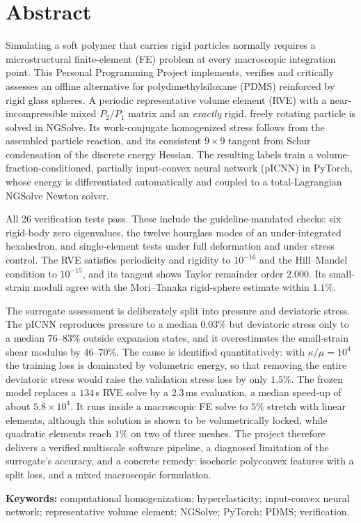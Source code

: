 \chapter*{Abstract}

Simulating a soft polymer that carries rigid particles normally requires a
microstructural finite-element (FE) problem at every macroscopic integration
point. This Personal Programming Project implements, verifies and critically
assesses an offline alternative for polydimethylsiloxane (PDMS) reinforced by
rigid glass spheres. A periodic representative volume element (RVE) with a
near-incompressible mixed $P_2/P_1$ matrix and an \emph{exactly} rigid,
freely rotating particle is solved in NGSolve. Its work-conjugate homogenized
stress follows from the assembled particle reaction, and its consistent
$9\times9$ tangent from Schur condensation of the discrete energy Hessian. The
resulting labels train a volume-fraction-conditioned, partially input-convex
neural network (pICNN) in PyTorch, whose energy is differentiated
automatically and coupled to a total-Lagrangian NGSolve Newton solver.

All 26 verification tests pass. These include the guideline-mandated checks:
six rigid-body zero eigenvalues, the twelve hourglass modes of an under-integrated hexahedron, and
single-element tests under full deformation and under stress control. The RVE satisfies periodicity and rigidity to $10^{-16}$ and the
Hill--Mandel condition to $10^{-15}$, and its tangent shows Taylor remainder
order $2.000$. Its small-strain moduli agree with the Mori--Tanaka rigid-sphere
estimate within $1.1\%$.

The surrogate assessment is deliberately split into pressure and deviatoric
stress. The pICNN reproduces pressure to a median $0.03\%$ but deviatoric stress
only to a median $76$--$83\%$ outside expansion states, and it overestimates the small-strain shear
modulus by $46$--$70\%$. The cause is identified quantitatively: with
$\kappa/\mu=10^4$ the training loss is dominated by volumetric energy, so that
removing the entire deviatoric stress would raise the validation stress loss
by only $1.5\%$. The
frozen model replaces a $134\,$s RVE solve by a $2.3\,$ms evaluation, a median
speed-up of about $5.8\times10^4$. It runs inside a macroscopic FE solve to
$5\%$ stretch with linear elements, although this solution is shown to be
volumetrically locked, while quadratic elements reach $1\%$ on two of three meshes. The project
therefore delivers a verified multiscale software pipeline, a diagnosed
limitation of the surrogate's accuracy, and a concrete remedy: isochoric
polyconvex features with a split loss, and a mixed macroscopic formulation.

\medskip\noindent\textbf{Keywords:} computational homogenization;
hyperelasticity; input-convex neural network; representative volume element;
NGSolve; PyTorch; PDMS; verification.
